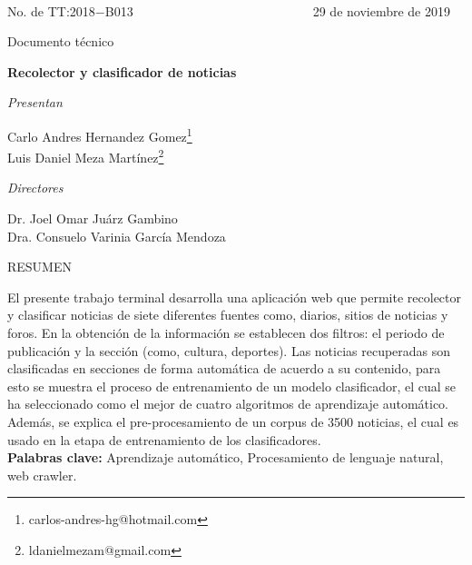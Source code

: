 \ \\[1cm]
No. de TT:2018$-$B013  
$\ \ \ \ \ \ \ \ \ \ \ \ \ \ \ \ \ \ \ \ \ \ \ \ \ \ \ \ \ \ \ \ \ \ \ \ \ \ \ \ \ \ \ \ \ \ \ \ \ \ \ \ \ \ \ \ \ \ \ \ \ $
29 de noviembre de 2019

\begin{center}

  \begin{large}
    Documento técnico\\[1cm]
  \end{large}

  \textbf{ \LARGE{R}\LARGE{ecolector} \LARGE{y} \LARGE{clasificador} \LARGE{de}  
  \LARGE{noticias}}\\[1cm]

  \begin{large}
    \textit{Presentan}\\[0.5cm]
  \end{large}

  \large{Carlo Andres Hernandez Gomez}\footnote{carlos-andres-hg@hotmail.com}\\
  \large{Luis Daniel Meza Martínez}\footnote{ldanielmezam@gmail.com}\\[0.5cm]

  \begin{large}
    \textit{Directores}\\[0.5cm]
  \end{large}

  \large{Dr. Joel Omar Juárz Gambino }\\
  \large{Dra. Consuelo Varinia García Mendoza }\\[0.5cm]

  \begin{large}
   RESUMEN\\[0.5cm]
  \end{large}


\end{center}

El presente trabajo terminal desarrolla una aplicación web que permite recolector y clasificar noticias de siete diferentes fuentes como, diarios, sitios de noticias y foros. En la obtención de la información se establecen dos filtros: el periodo de publicación y la sección (como, cultura, deportes). Las noticias recuperadas son clasificadas en secciones de forma automática de acuerdo a su contenido, para esto se muestra el proceso de entrenamiento de un modelo clasificador, el cual se ha seleccionado como el mejor de cuatro algoritmos de aprendizaje automático. Además, se explica el pre-procesamiento de un corpus de 3500 noticias, el cual es usado en la etapa de entrenamiento de los clasificadores.\\

\textbf{Palabras clave:} Aprendizaje automático, Procesamiento de lenguaje natural, web crawler.
